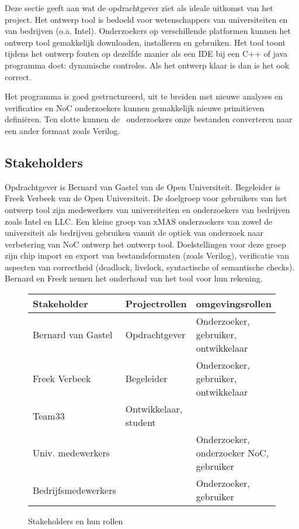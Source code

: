 Deze sectie geeft aan wat de opdrachtgever ziet als ideale uitkomst van het project. Het ontwerp tool is
bedoeld voor wetenschappers van universiteiten en van bedrijven (o.a. Intel). Onderzoekers op verschillende
platformen kunnen het ontwerp tool gemakkelijk downloaden, installeren en gebruiken. Het tool toont tijdens
het ontwerp fouten op dezelfde manier als een IDE bij een C++ of java programma doet: dynamische controles.
Als het ontwerp klaar is dan is het ook correct.

Het programma is goed gestructureerd, uit te breiden met nieuwe analyses en verificaties en NoC onderzoekers
kunnen gemakkelijk nieuwe primitieven defini\"eren. Ten slotte kunnen de \xmas\ onderzoekers onze bestanden
converteren naar een ander formaat zoals Verilog.

\subsection{Stakeholders}

Opdrachtgever is Bernard van Gastel van de Open Universiteit. Begeleider is Freek Verbeek van de Open Universiteit.
De doelgroep voor gebruikers van het ontwerp tool zijn medewerkers van universiteiten en onderzoekers van bedrijven zoals
Intel en LLC. Een kleine groep van xMAS onderzoekers van zowel de universiteit als bedrijven gebruiken vanuit de optiek
van onderzoek naar verbetering van NoC ontwerp het ontwerp tool. Doelstellingen voor deze groep zijn chip import
en export van bestandsformaten (zoals Verilog), verificatie van aspecten van correctheid (deadlock, livelock,
syntactische of semantische checks). Bernard en Freek nemen het onderhoud van het tool voor hun rekening.


\begin{figure}
{\tiny
\begin{center}
\begin{tabular}{lll}\hline
{\bf Stakeholder}    & {\bf Projectrollen}   & {\bf omgevingsrollen} \\\hline
Bernard van Gastel   & Opdrachtgever         & Onderzoeker, gebruiker, ontwikkelaar\\
Freek Verbeek        & Begeleider            & Onderzoeker, gebruiker, ontwikkelaar \\
Team33               & Ontwikkelaar, student & \\
Univ. medewerkers    &                       & Onderzoeker, onderzoeker NoC, gebruiker \\
Bedrijfsmedewerkers  &                       & Onderzoeker, gebruiker \\
\hline
\end{tabular}
\end{center}
}%
\caption{Stakeholders en hun rollen}\label{fig:stakeholders}
\end{figure}

